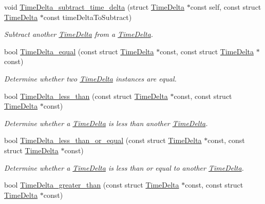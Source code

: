 \begin{DoxyCompactItemize}
void \hyperlink{time-delta_8h_a24fafdc5f4cef060d1d2ad269952f82a}{\-Time\-Delta\-\_\-subtract\-\_\-time\-\_\-delta} (struct \hyperlink{structTimeDelta}{\-Time\-Delta} $\ast$const self, const struct \hyperlink{structTimeDelta}{\-Time\-Delta} $\ast$const time\-Delta\-To\-Subtract)
\begin{DoxyCompactList}\small\item\em \-Subtract another \hyperlink{structTimeDelta}{\-Time\-Delta} from a \hyperlink{structTimeDelta}{\-Time\-Delta}. \end{DoxyCompactList}\item 
bool \hyperlink{time-delta_8h_ae43460348083663634bd5bef6c5ab885}{\-Time\-Delta\-\_\-equal} (const struct \hyperlink{structTimeDelta}{\-Time\-Delta} $\ast$const, const struct \hyperlink{structTimeDelta}{\-Time\-Delta} $\ast$const)
\begin{DoxyCompactList}\small\item\em \-Determine whether two \hyperlink{structTimeDelta}{\-Time\-Delta} instances are equal. \end{DoxyCompactList}\item 
bool \hyperlink{time-delta_8h_a9494ddb1994d09d928a17bc5d8f12a5a}{\-Time\-Delta\-\_\-less\-\_\-than} (const struct \hyperlink{structTimeDelta}{\-Time\-Delta} $\ast$const, const struct \hyperlink{structTimeDelta}{\-Time\-Delta} $\ast$const)
\begin{DoxyCompactList}\small\item\em \-Determine whether a \hyperlink{structTimeDelta}{\-Time\-Delta} is less than another \hyperlink{structTimeDelta}{\-Time\-Delta}. \end{DoxyCompactList}\item 
bool \hyperlink{time-delta_8h_a97644eac25e86eb3b1895cb5a668c25b}{\-Time\-Delta\-\_\-less\-\_\-than\-\_\-or\-\_\-equal} (const struct \hyperlink{structTimeDelta}{\-Time\-Delta} $\ast$const, const struct \hyperlink{structTimeDelta}{\-Time\-Delta} $\ast$const)
\begin{DoxyCompactList}\small\item\em \-Determine whether a \hyperlink{structTimeDelta}{\-Time\-Delta} is less than or equal to another \hyperlink{structTimeDelta}{\-Time\-Delta}. \end{DoxyCompactList}\item 
bool \hyperlink{time-delta_8h_a7ef30d66e1eeea47ea7000775614020e}{\-Time\-Delta\-\_\-greater\-\_\-than} (const struct \hyperlink{structTimeDelta}{\-Time\-Delta} $\ast$const, const struct \hyperlink{structTimeDelta}{\-Time\-Delta} $\ast$const)

\end{DoxyCompactItemize}
